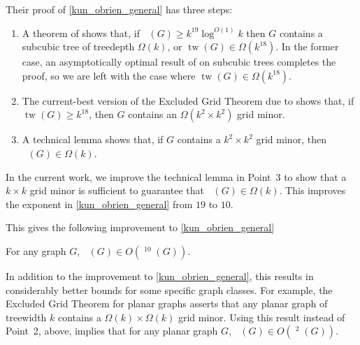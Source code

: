 \documentclass{patmorin}
\DeclareMathOperator{\tw}{tw}
\DeclareMathOperator{\chicen}{\chi_{\mathrm{cen}}}
\DeclareMathOperator{\chilin}{\chi_{\mathrm{lin}}}
\begin{document}
Their proof of \cref{kun_obrien_general} has three steps:
\begin{enumerate}
  \item A theorem of \citet{kawarabayashi.rossman:polynomial} shows that, if $\chicen(G)\ge k^{19}\log^{O(1)} k$ then $G$ contains a subcubic tree of treedepth $\Omega(k)$, or $\tw(G)\in\Omega(k^{18})$.  In the former case, an asymptotically optimal result of \citet{kun.obrien.ea:polynomial} on subcubic trees completes the proof, so we are left with the case where $\tw(G)\in\Omega(k^{18})$.
  \item The current-best version of the Excluded Grid Theorem due to \citet{chuzhoy:improved} shows that, if $\tw(G)\ge k^{18}$, then $G$ contains an $\Omega(k^2\times k^2)$ grid minor.
  \item A technical lemma \cite[Lemma~5]{kun.obrien.ea:polynomial} shows that, if $G$ contains a $k^2\times k^2$ grid minor, then $\chilin(G)\in\Omega(k)$.
\end{enumerate}

In the current work, we improve the technical lemma in Point~3 to show that a $k\times k$ grid minor is sufficient to guarantee that $\chilin(G)\in\Omega(k)$. This improves the exponent in \cref{kun_obrien_general} from $19$ to $10$.

This gives the following improvement to \cref{kun_obrien_general}
\begin{thm}\label{kun_obrien_general2}
  For any graph $G$, $\chicen(G)\in O(\chilin^{10}(G))$.
\end{thm}


In addition to the improvement to \cref{kun_obrien_general}, this results in considerably better bounds for some specific graph classes.  For example, the Excluded Grid Theorem for planar graphs asserts that any planar graph of treewidth $k$ contains a $\Omega(k)\times \Omega(k)$ grid minor.  Using this result instead of Point~2, above, implies that for any planar graph $G$, $\chicen(G)\in O(\chilin^2(G))$.
\end{document}
